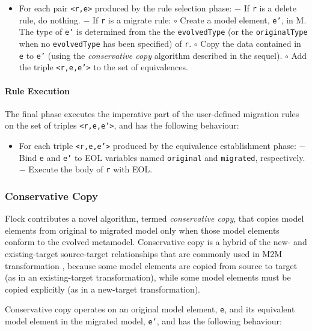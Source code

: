 \begin{itemize}
	\item For each pair \texttt{<r,e>} produced by the rule selection phase:
	\subitem $-$ If \texttt{r} is a delete rule, do nothing.
	\subitem $-$ If \texttt{r} is a migrate rule:
	\subsubitem $\circ$ Create a model element, \texttt{e'}, in M. The type of \texttt{e'} is determined from the the \texttt{evolvedType} (or the \texttt{originalType} when no \texttt{evolvedType} has been specified) of \texttt{r}.
	\subsubitem $\circ$ Copy the data contained in \texttt{e} to \texttt{e'} (using the \emph{conservative copy} algorithm described in the sequel).
	\subsubitem $\circ$ Add the triple \texttt{<r,e,e'>} to the set of equivalences.
\end{itemize}
	
\paragraph{Rule Execution}
The final phase executes the imperative part of the user-defined migration rules on the set of triples \texttt{<r,e,e'>}, and has the following behaviour:

\begin{itemize}
	\item For each triple \texttt{<r,e,e'>} produced by the equivalence establishment phase:
	\subitem $-$ Bind \texttt{e} and \texttt{e'} to EOL variables named \texttt{original} and \texttt{migrated}, respectively.
	\subitem $-$ Execute the body of \texttt{r} with EOL.
\end{itemize}


\subsubsection{Conservative Copy}
\label{subsubsec:conservative_copying}
Flock contributes a novel algorithm, termed \emph{conservative copy}, that copies model elements from original to migrated model only when those model elements conform to the evolved metamodel. Conservative copy is a hybrid of the new- and existing-target source-target relationships that are commonly used in M2M transformation \cite{czarnecki06survey}, because some model elements are copied from source to target (as in an existing-target transformation), while some model elements must be copied explicitly (as in a new-target transformation).

Conservative copy operates on an original model element, \texttt{e}, and its equivalent model element in the migrated model, \texttt{e'}, and has the following behaviour:

